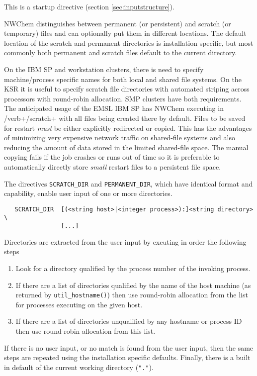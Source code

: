 This is a startup directive (section \ref{sec:inputstructure}).

NWChem distinguishes between permanent (or persistent) and scratch (or
temporary) files and can optionally put them in different locations.
The default location of the scratch and permanent directories is
installation specific, but most commonly both permanent and scratch
files default to the current directory.

On the IBM SP and workstation clusters, there is need to specify
machine/process specific names for both local and shared file systems.
On the KSR it is useful to specify scratch file directories with
automated striping across processors with round-robin allocation.  SMP
clusters have both requirements.  The anticipated usage of the EMSL
IBM SP has NWChem executing in /verb+/scratch+ with all files
being created there by default.  Files to be saved for restart {\em
  must} be either explicitly redirected or copied.  This has the
advantages of minimizing very expensive network traffic on shared-file
systems and also reducing the amount of data stored in the limited
shared-file space.  The manual copying fails if the job crashes or
runs out of time so it is preferable to automatically directly store
{\em small} restart files to a persistent file space.

The directives \verb+SCRATCH_DIR+ and \verb+PERMANENT_DIR+, which have
identical format and capability, enable user input of one or more
directories.

\begin{verbatim}
   SCRATCH_DIR  [(<string host>|<integer process>):]<string directory> \ 
                [...]
\end{verbatim}

Directories are extracted from the user input by excuting in order the
following steps
\begin{enumerate}
\item Look for a directory qualified by the process number of the
  invoking process.
\item If there are a list of directories qualified by the name of the
  host machine (as returned by \verb+util_hostname()+) then use
  round-robin allocation from the list for processes executing on the
  given host.
\item If there are a list of directories unqualified by any hostname
  or process ID then use round-robin allocation from this list.
\end{enumerate}
If there is no user input, or no match is found from the user input,
then the same steps are repeated using the installation specific
defaults.  Finally, there is a built in default of the current working
directory (\verb+"."+).

